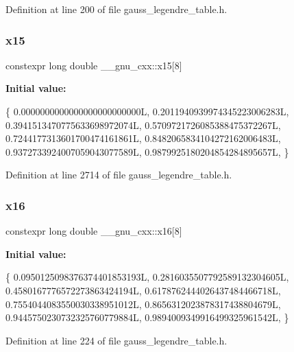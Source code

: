 Definition at line 200 of file gauss\+\_\+legendre\+\_\+table.\+h.

\mbox{\label{namespace____gnu__cxx_a68e1a5768f125278bd01010a8f0885ca}} 
\subsubsection{\texorpdfstring{x15}{x15}}
{\footnotesize\ttfamily constexpr long double \+\_\+\+\_\+gnu\+\_\+cxx\+::x15\mbox{[}8\mbox{]}}

{\bfseries Initial value\+:}
\begin{DoxyCode}
\{
    0.0000000000000000000000000L,
    0.2011940939974345223006283L,
    0.3941513470775633698972074L,
    0.5709721726085388475372267L,
    0.7244177313601700474161861L,
    0.8482065834104272162006483L,
    0.9372733924007059043077589L,
    0.9879925180204854284895657L,
  \}
\end{DoxyCode}


Definition at line 2714 of file gauss\+\_\+legendre\+\_\+table.\+h.

\mbox{\label{namespace____gnu__cxx_a88fb54db835c7632b648c2882bf401af}} 
\subsubsection{\texorpdfstring{x16}{x16}}
{\footnotesize\ttfamily constexpr long double \+\_\+\+\_\+gnu\+\_\+cxx\+::x16\mbox{[}8\mbox{]}}

{\bfseries Initial value\+:}
\begin{DoxyCode}
\{
    0.0950125098376374401853193L,
    0.2816035507792589132304605L,
    0.4580167776572273863424194L,
    0.6178762444026437484466718L,
    0.7554044083550030338951012L,
    0.8656312023878317438804679L,
    0.9445750230732325760779884L,
    0.9894009349916499325961542L,
  \}
\end{DoxyCode}


Definition at line 224 of file gauss\+\_\+legendre\+\_\+table.\+h.

\mbox{\label{namespace____gnu__cxx_a733fb111a693485e01949cd6f5f2836e}} 

